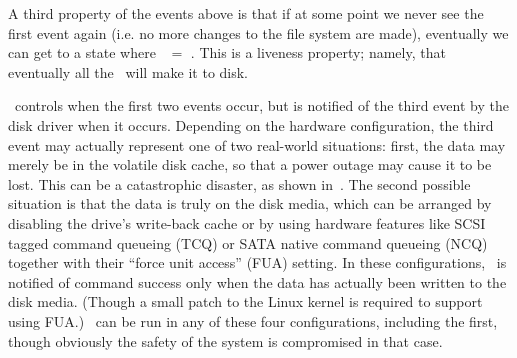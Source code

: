 A third property of the events above is that if at some point we never see the
first event again (i.e. no more changes to the file system are made), eventually
we can get to a state where \ChDisk\ $=$ \ChAll. This is a liveness property;
namely, that eventually all the \chdescs\ will make it to disk.

\Kudos\ controls when the first two events occur, but is notified of the third
event by the disk driver when it occurs. Depending on the hardware
configuration, the third event may actually represent one of two real-world
situations: first, the data may merely be in the volatile disk cache, so that a
power outage may cause it to be lost. This can be a catastrophic disaster, as
shown in~\cite{nightingale06rethink}. The second possible situation is that the
data is truly on the disk media, which can be arranged by disabling the drive's
write-back cache or by using hardware features like SCSI tagged command queueing
(TCQ) or SATA native command queueing (NCQ) together with their ``force unit
access'' (FUA) setting. In these configurations, \Kudos\ is notified of command
success only when the data has actually been written to the disk media. (Though
a small patch to the Linux kernel is required to support using FUA.) \Kudos\ can
be run in any of these four configurations, including the first, though
obviously the safety of the system is compromised in that case.

